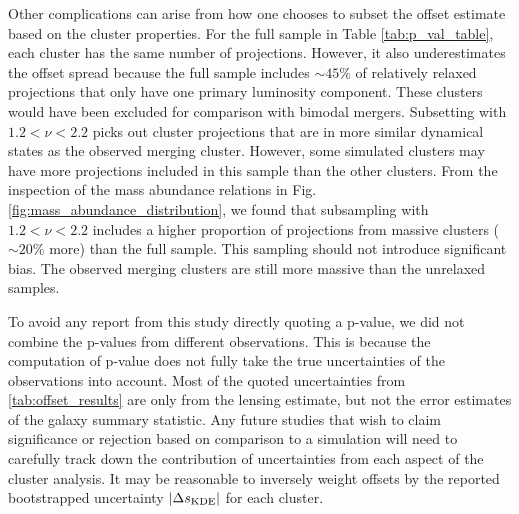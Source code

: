 Other complications can arise from how one chooses to subset the offset estimate
based on the cluster properties.
For the full sample in Table \ref{tab:p_val_table},  each cluster has the same number of projections. 
However, it also underestimates the offset spread because the
full sample includes $\sim 45\%$ of relatively relaxed projections 
that only have one primary luminosity component.  These clusters would
have been excluded for comparison with bimodal mergers. 
Subsetting with $1.2 < \nu < 2.2$ picks out
cluster projections that are in more similar dynamical states as the observed merging
cluster. 
However, some simulated clusters may have more projections included in this sample
than the other clusters. From the inspection of the mass abundance relations in 
Fig. \ref{fig:mass_abundance_distribution}, we found that subsampling with $1.2 <
\nu <2.2$ includes a higher proportion of projections from massive clusters
($\sim 20\%$ more) than 
the full sample. This sampling should not introduce significant bias. 
The observed merging clusters are still more massive than the unrelaxed samples. 

To avoid any report from this study directly quoting a p-value, we did not
combine the p-values from different observations. 
This is because the computation of p-value does not fully
take the true uncertainties of the observations into account. 
Most of the quoted uncertainties from \ref{tab:offset_results} are only 
from the lensing estimate, but not the error estimates of the galaxy summary 
statistic. 
Any future studies that wish to claim significance or rejection based on
comparison to a simulation will 
need to carefully track down the contribution of uncertainties from each aspect
of the cluster analysis.  
It may be reasonable to inversely weight offsets by the 
reported bootstrapped uncertainty $|\Delta s_{\rm KDE}|$ for each cluster.

